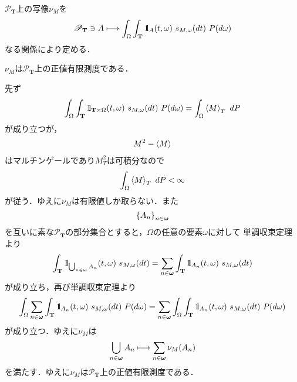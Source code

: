 	$\mathscr{P}_{\mathbf{T}}$上の写像$\nu_M$を
	\begin{align}
		\mathscr{P}_{\mathbf{T}} \ni A \longmapsto
		\int_\Omega \int_{\mathbf{T}} \defunc_A(t,\omega)\ s_{M,\omega}(dt)\ P(d\omega)
	\end{align}
	なる関係により定める．
	
	\begin{screen}
		\begin{thm}[二乗可積分マルチンゲールで構成する測度]
			$\nu_M$は$\mathscr{P}_{\mathbf{T}}$上の正値有限測度である．
		\end{thm}
	\end{screen}
	
	\begin{sketch}
		先ず
		\begin{align}
			\int_\Omega \int_{\mathbf{T}} \defunc_{\mathbf{T} \times \Omega}(t,\omega)\ s_{M,\omega}(dt)\ P(d\omega)
			= \int_\Omega \inprod<M>_T\ dP
		\end{align}
		が成り立つが，
		\begin{align}
			M^2 - \inprod<M>
		\end{align}
		はマルチンゲールであり$M_T^2$は可積分なので
		\begin{align}
			\int_\Omega \inprod<M>_T\ dP < \infty
		\end{align}
		が従う．ゆえに$\nu_M$は有限値しか取らない．また
		\begin{align}
			\left\{A_n\right\}_{n \in {\boldsymbol \omega}}
		\end{align}
		を互いに素な$\mathscr{P}_{\mathbf{T}}$の部分集合とすると，$\Omega$の任意の要素$\omega$に対して
		単調収束定理より
		\begin{align}
			\int_{\mathbf{T}} \mbox{1}\hspace{-0.25em}\mbox{l}_{\bigcup_{n \in {\boldsymbol \omega}}A_n}(t,\omega)\ s_{M,\omega}(dt)
			= \sum_{n \in {\boldsymbol \omega}} \int_{\mathbf{T}} \mbox{1}\hspace{-0.25em}\mbox{l}_{A_n}(t,\omega)\ s_{M,\omega}(dt)
		\end{align}
		が成り立ち，再び単調収束定理より
		\begin{align}
			\int_\Omega \sum_{n \in {\boldsymbol \omega}} \int_{\mathbf{T}} \mbox{1}\hspace{-0.25em}\mbox{l}_{A_n}(t,\omega)\ s_{M,\omega}(dt)\ P(d\omega)
			= \sum_{n \in {\boldsymbol \omega}} \int_\Omega \int_{\mathbf{T}} \mbox{1}\hspace{-0.25em}\mbox{l}_{A_n}(t,\omega)\ s_{M,\omega}(dt)\ P(d\omega)
		\end{align}
		が成り立つ．ゆえに$\nu_M$は
		\begin{align}
			\bigcup_{n \in {\boldsymbol \omega}} A_n \longmapsto \sum_{n \in {\boldsymbol \omega}} \nu_M(A_n)
		\end{align}
		を満たす．ゆえに$\nu_M$は$\mathscr{P}_{\mathbf{T}}$上の正値有限測度である．
		\QED
	\end{sketch}
	
